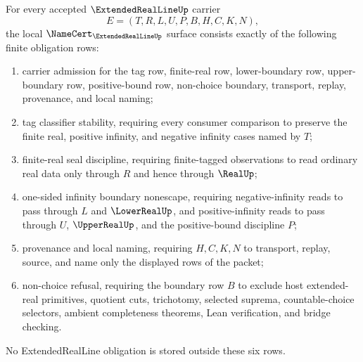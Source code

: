 \begin{theorem}
\label{thm:extended-real-line-namecert-obligations}
For every accepted $\ExtendedRealLineUp$ carrier
$$
E=(T,R,L,U,P,B,H,C,K,N),
$$
the local $\NameCert_{\ExtendedRealLineUp}$ surface consists exactly of the following finite obligation rows:
\begin{enumerate}
\item carrier admission for the tag row, finite-real row, lower-boundary row, upper-boundary row, positive-bound row, non-choice boundary, transport, replay, provenance, and local naming;
\item tag classifier stability, requiring every consumer comparison to preserve the finite real, positive infinity, and negative infinity cases named by $T$;
\item finite-real seal discipline, requiring finite-tagged observations to read ordinary real data only through $R$ and hence through $\RealUp$;
\item one-sided infinity boundary nonescape, requiring negative-infinity reads to pass through $L$ and $\LowerRealUp$, and positive-infinity reads to pass through $U$, $\UpperRealUp$, and the positive-bound discipline $P$;
\item provenance and local naming, requiring $H,C,K,N$ to transport, replay, source, and name only the displayed rows of the packet;
\item non-choice refusal, requiring the boundary row $B$ to exclude host extended-real primitives, quotient cuts, trichotomy, selected suprema, countable-choice selectors, ambient completeness theorems, Lean verification, and bridge checking.
\end{enumerate}
No ExtendedRealLine obligation is stored outside these six rows.
\end{theorem}
